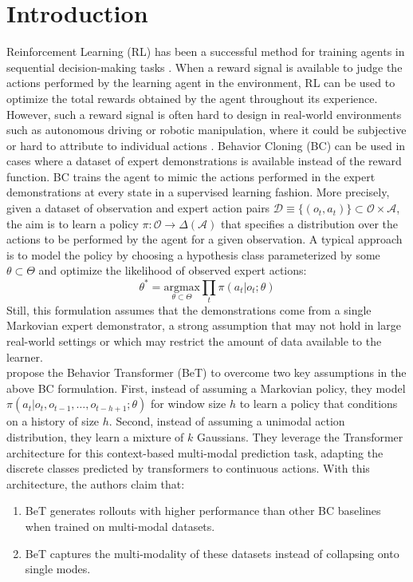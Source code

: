 \section{Introduction}
\label{sec:intro}

Reinforcement Learning (RL) \parencite{sutton_reinforcement_2018} has been a successful method for training agents in sequential decision-making tasks \parencite{mnih_human-level_2015}.
When a reward signal is available to judge the actions performed by the learning agent in the environment, RL can be used to optimize the total rewards obtained by the agent throughout its experience.
However, such a reward signal is often hard to design in real-world environments such as autonomous driving or robotic manipulation, where it could be subjective or hard to attribute to individual actions \parencite{ng_algorithms_2000}.
Behavior Cloning (BC) \parencite{osa_algorithmic_2018} can be used in cases where a dataset of expert demonstrations is available instead of the reward function.
BC trains the agent to mimic the actions performed in the expert demonstrations at every state in a supervised learning fashion.
More precisely, given a dataset of observation and expert action pairs $\mathcal{D} \equiv \{(o_t, a_t)\} \subset \mathcal{O} \times \mathcal{A}$, the aim is to learn a policy $\pi:\mathcal{O} \to \Delta(\mathcal{A})$ that specifies a distribution over the actions to be performed by the agent for a given observation.
A typical approach is to model the policy by choosing a hypothesis class parameterized by some $\theta \subset \Theta$ and optimize the likelihood of observed expert actions:
\begin{equation}
    \theta^* = \underset{\theta \subset \Theta}{\mathrm{argmax}} \prod_{t}  \pi(a_t | o_t; \theta)
\end{equation}
Still, this formulation assumes that the demonstrations come from a single Markovian expert demonstrator, a strong assumption that may not hold in large real-world settings or which may restrict the amount of data available to the learner.\\

\citet{shafiullah2022behavior} propose the Behavior Transformer (BeT) to overcome two key assumptions in the above BC formulation.
First, instead of assuming a Markovian policy, they model $\pi(a_t | o_t, o_{t-1}, \ldots, o_{t-h+1}; \theta)$ for window size $h$ to learn a policy that conditions on a history of size $h$.
Second, instead of assuming a unimodal action distribution, they learn a mixture of $k$ Gaussians.
They leverage the Transformer \cite{vaswani_attention_2017} architecture for this context-based multi-modal prediction task, adapting the discrete classes predicted by transformers to continuous actions.
With this architecture, the authors claim that:
\begin{enumerate}
    \item BeT generates rollouts with higher performance than other BC baselines when trained on multi-modal datasets. \label{claim:author-1}
    \item BeT captures the multi-modality of these datasets instead of collapsing onto single modes. \label{claim:author-2}
\end{enumerate}